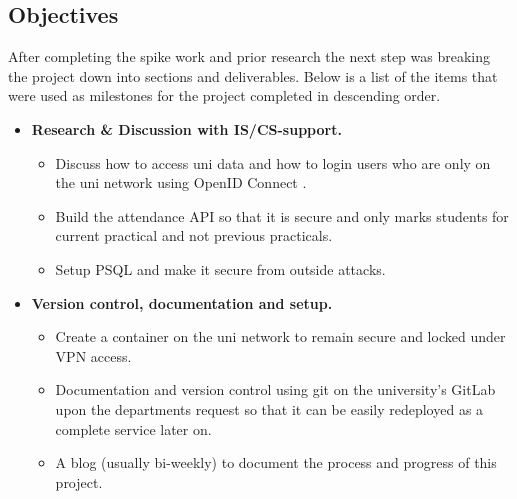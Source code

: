 \subsection{Objectives}\label{sec1:obj}
After completing the spike work and prior research the next step was breaking the project down into sections and deliverables. Below is a list of the items that were used as milestones for the project completed in descending order.

\begin{itemize}
	\item \textbf{Research \& Discussion with IS/CS-support.}
	\begin{itemize}
		\item Discuss how to access uni data and how to login users who are only on the uni network using OpenID Connect \cite{OpenID}.
		\item Build the attendance API so that it is secure and only marks students for current practical and not previous practicals.
		\item Setup PSQL \cite{psql} and make it secure from outside attacks.
	\end{itemize}
	
	\item \textbf{Version control, documentation and setup.}
	\begin{itemize}
		\item Create a container on the uni network to remain secure and locked under VPN access.
		\item Documentation and version control using git on the university's GitLab upon the departments request so that it can be easily redeployed as a complete service later on.
		\item A blog (usually bi-weekly) to document the process and progress of this project.
	\end{itemize}
	

\end{itemize}
